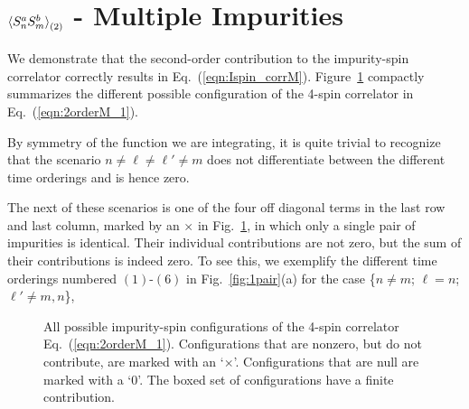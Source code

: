 \documentclass[aps,prb,twocolumn,superscriptaddress]{revtex4-1}
\begin{document}
\section{$\braket{S_{n}^{a}S_{m}^{b}}_{(2)}$ - Multiple Impurities} \label{app:spincorrM_int}
We demonstrate that the second-order contribution to the impurity-spin correlator correctly results in Eq.~(\ref{eqn:Ispin_corrM}). Figure~\ref{fig:4spin_config} compactly summarizes the different possible configuration of the 4-spin correlator in Eq.~(\ref{eqn:2orderM_1}). 

By symmetry of the function we are integrating, it is quite trivial to recognize that the scenario $n\ne\ell\ne\ell'\ne m$ does not differentiate between the different time orderings and is hence zero. 

The next of these scenarios is one of the four off diagonal terms in the last row and last column, marked by an $\times$ in Fig.~\ref{fig:4spin_config}, in which only a single pair of impurities is identical. Their individual contributions are not zero, but the sum of their contributions is indeed zero. To see this, we exemplify the different time orderings numbered $(1)$-$(6)$ in Fig.~\ref{fig:1pair}(a) for the case \{$n \ne m$; $\ell=n$; $\ell'\ne m,n$\}, 
\begin{figure}[!ht]
	\caption{All possible impurity-spin configurations of the 4-spin correlator Eq.~(\ref{eqn:2orderM_1}). Configurations that are nonzero, but do not contribute, are marked with an `$\times$'. Configurations that are null are marked with a `$0$'. The boxed set of configurations have a finite contribution.}
	\label{fig:4spin_config} 
\end{figure}
\end{document}
